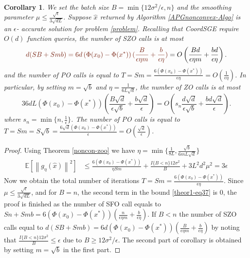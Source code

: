 \documentclass{article}
\newcommand*{\E}{\mathbb{E}}
\newcommand{\norm}[1]{\left\lVert#1\right\rVert}
\newtheorem{corollary}[theorem]{Corollary}
\theoremstyle{definition}
\theoremstyle{remark}
\begin{document}
 \begin{corollary}\label{corr11}
We set the batch size $B = \min\{12\sigma^2/\epsilon, n\}$ and the smoothing parameter $\mu \leq \frac{\sqrt{\epsilon}}{3\sqrt{dL}}$. Suppose $\hat{x}$ returned by Algorithm \ref{APGnonconvex-Algo}  is an $\epsilon$- accurate solution for problem \eqref{problem}. Recalling that CoordSGE require $O(d)$ function queries, the number of SZO calls is at most 
\begin{equation}\label{SZO-call-nocon}
{\color{Brown}d(SB+Smb) = 6d \left(\Phi(x_0) - \Phi({x}^*)\right) (\frac{B}{\epsilon\eta m}+\frac{b}{\epsilon\eta})} = O\left(\frac{Bd}{\epsilon\eta m}+\frac{bd}{\epsilon\eta}\right).
\end{equation} 
and the number of PO calls is equal to $T = Sm = \frac{6\left(\Phi(x_0) - \Phi({x}^*)\right)}{\epsilon\eta} = O\left(\frac{1}{\epsilon\eta}\right)$. In particular, by setting $m=\sqrt{b}$ and {\color{Brown}$\eta = \frac{1}{6L\sqrt{d}}$}, the number of ZO calls is at most 
\begin{equation}\label{SZO-call-par-nocon}
36d L (\Phi(x_0)-\Phi(x^*))\left(\frac{B\sqrt{d}}{\epsilon\sqrt{b}}+\frac{b\sqrt{d}}{\epsilon}\right) = O\left(s_n\frac{d\sqrt{d}}{\epsilon \sqrt{b}}+\frac{bd\sqrt{d}}{\epsilon}\right).
\end{equation}
where $s_n = \min\{n,\frac{1}{\epsilon}\}$. The number of PO calls is equal to $T = Sm = S\sqrt{b} = \frac{6\sqrt{d}\left(\Phi(x_0) - \Phi({x}^*)\right)}{\epsilon} = O\left(\frac{\sqrt{d}}{\epsilon}\right)$. 
\end{corollary}
\begin{proof}
Using Theorem \ref{noncon-zoo} we have $\eta = \min\{\frac{1}{8L}, \frac{\sqrt{b}}{6mL\sqrt{d}}\}$
\begin{align}
\E[\norm{g_{\eta}(\hat{x})}^2] & \leq \frac{6\left(\Phi(x_0) - \Phi({x}^*)\right)}{\eta Sm} + \frac{I\{B < n\}12 \sigma ^2}{B}+3{L^2 d^2 \mu^2} = 3\epsilon\label{theor1-eq37}
 \end{align} 
 Now we obtain the total number of iterations  {\color{Brown} $T = Sm = \frac{6\left(\Phi(x_0) - \Phi({x}^*)\right)}{\epsilon\eta}$}. Since $\mu \leq \frac{\sqrt{\epsilon}}{3\sqrt{dL}}$, and for $B = n$, the second term in the bound \eqref{theor1-eq37} is $0$, the proof is finished as the number of SFO call equals to {\color{Brown}$Sn+Smb = 6 \left(\Phi(x_0) - \Phi({x}^*)\right) (\frac{n}{\epsilon\eta m}+\frac{b}{\epsilon\eta})$}. If  $B < n$ the number of SZO calls equal to  {\color{Brown}$d(SB+Smb) = 6d \left(\Phi(x_0) - \Phi({x}^*)\right) (\frac{B}{\epsilon\eta m}+\frac{b}{\epsilon\eta})$} by noting that $\frac{I\{B < n\}12\sigma^2}{B} \leq \epsilon$ due to $B \geq 12\sigma^2 /\epsilon$. The second part of corollary is obtained by setting $m = \sqrt{b}$ in the first part.
\end{proof}
\end{document}
